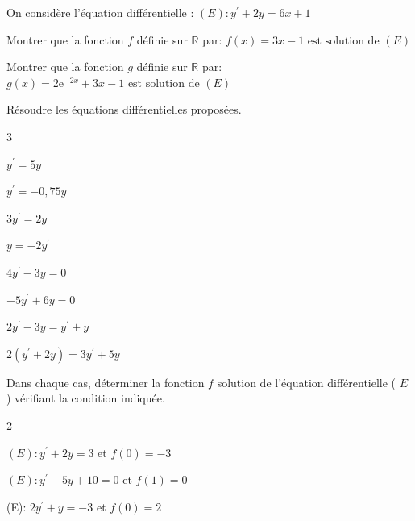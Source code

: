 \documentclass[11pt,a4paper]{article}  %
\begin{document}
\exerciceDS{}

On considère l'équation différentielle : $(E): y^{\prime}+2 y=6 x+1$

\begin{enumMet}
	\item Montrer que la fonction $f$ définie sur $\mathbb{R}$ par: $f(x)=3 x-1 \text { est solution de }(E)$
	\item Montrer que la fonction $g$ définie sur $\mathbb{R}$ par: $g(x)=2 \mathrm{e}^{-2 x}+3 x-1 \text { est solution de }(E)$
\end{enumMet}

\exerciceDS{}

Résoudre les équations différentielles proposées.

\begin{multicols}{3}
	\begin{enumMet}
	\item $y^{\prime}=5 y$
	\item $y^{\prime}=-0,75 y$
	\item $3 y^{\prime}=2 y$
	\item $y=-2 y^{\prime}$
	\item $4 y^{\prime}-3 y=0$
	\item $-5 y^{\prime}+6 y=0$
	\item $2 y^{\prime}-3 y=y^{\prime}+y$
	\item $2\left(y^{\prime}+2 y\right)=3 y^{\prime}+5 y$
\end{enumMet}
\end{multicols}

\exerciceDS{}

Dans chaque cas, déterminer la fonction $f$ solution de l'équation différentielle ( $E$ ) vérifiant la condition indiquée.
\begin{multicols}{2}
	\begin{enumMet}
	\item $(E): y^{\prime}+2 y=3$ et $f(0)=-3$
	\item $(E): y^{\prime}-5 y+10=0$ et $f(1)=0$
	\item (E): $2 y^{\prime}+y=-3$ et $f(0)=2$
\end{enumMet}
\end{multicols}

\newpage

\end{document}
